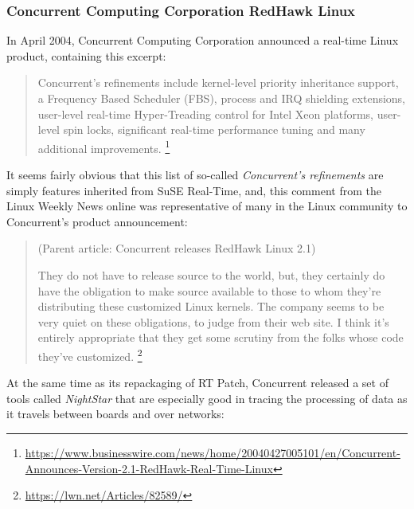 \documentclass[12pt]{article}
\begin{document}
\subsubsection{Concurrent Computing Corporation RedHawk Linux}

In April 2004, Concurrent Computing Corporation announced a real-time
Linux product, containing this excerpt:

\begin{quote}
Concurrent's refinements include kernel-level priority inheritance support,
a Frequency Based Scheduler (FBS), process and IRQ shielding extensions,
user-level real-time Hyper-Treading control for Intel Xeon platforms,
user-level spin locks, significant real-time performance tuning and
many additional improvements.%
\footnote{\url{https://www.businesswire.com/news/home/20040427005101/en/Concurrent-Announces-Version-2.1-RedHawk-Real-Time-Linux}}
\end{quote}

It seems fairly obvious that this list of so-called \emph{Concurrent's refinements}
are simply features inherited from SuSE Real-Time, and, this comment from the Linux
Weekly News online was representative of many in the Linux community to
Concurrent's product announcement:

\begin{quote}
(Parent article: Concurrent releases RedHawk Linux 2.1)

They do not have to release source to the world, but,
they certainly do have the obligation to make source
available to those to whom they're distributing these
customized Linux kernels. The company seems to be very quiet on these
obligations, to judge from their web site. I think it's entirely
appropriate that they get some scrutiny from the folks
whose code they've customized.%
\footnote{\url{https://lwn.net/Articles/82589/}}
\end{quote}

At the same time as its repackaging of RT Patch, Concurrent released a set of
tools called \emph{NightStar} that are especially good in tracing the processing
of data as it travels between boards and over networks:
\end{document}
